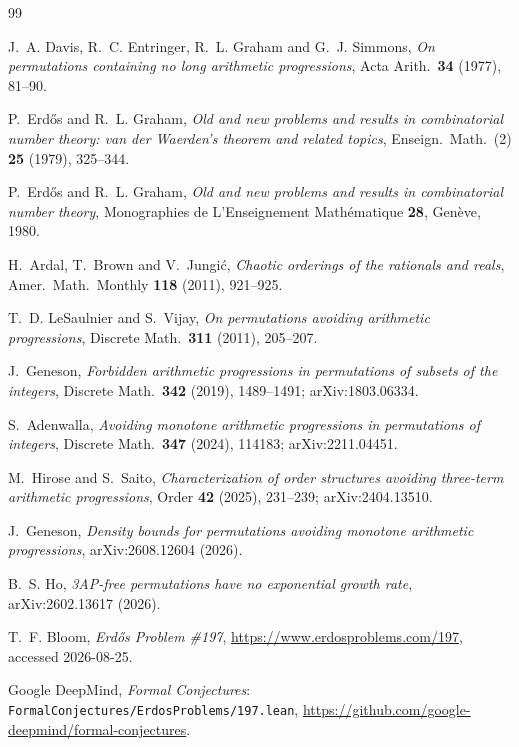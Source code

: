 \documentclass[11pt]{article}
\theoremstyle{definition}
\begin{document}
\begin{thebibliography}{99}

 J.~A. Davis, R.~C. Entringer, R.~L. Graham and
G.~J. Simmons, \emph{On permutations containing no long arithmetic
progressions}, Acta Arith.\ \textbf{34} (1977), 81--90.

 P.~Erd\H{o}s and R.~L. Graham, \emph{Old and new problems
and results in combinatorial number theory: van der Waerden's theorem and
related topics}, Enseign.\ Math.\ (2) \textbf{25} (1979), 325--344.

 P.~Erd\H{o}s and R.~L. Graham, \emph{Old and new problems
and results in combinatorial number theory}, Monographies de
L'Enseignement Math\'ematique \textbf{28}, Gen\`eve, 1980.

 H.~Ardal, T.~Brown and V.~Jungi\'c, \emph{Chaotic orderings
of the rationals and reals}, Amer.\ Math.\ Monthly \textbf{118} (2011),
921--925.

 T.~D. LeSaulnier and S.~Vijay, \emph{On permutations avoiding
arithmetic progressions}, Discrete Math.\ \textbf{311} (2011), 205--207.

 J.~Geneson, \emph{Forbidden arithmetic progressions in
permutations of subsets of the integers}, Discrete Math.\ \textbf{342}
(2019), 1489--1491; arXiv:1803.06334.

 S.~Adenwalla, \emph{Avoiding monotone arithmetic progressions
in permutations of integers}, Discrete Math.\ \textbf{347} (2024), 114183;
arXiv:2211.04451.

 M.~Hirose and S.~Saito, \emph{Characterization of order
structures avoiding three-term arithmetic progressions}, Order \textbf{42}
(2025), 231--239; arXiv:2404.13510.

 J.~Geneson, \emph{Density bounds for permutations avoiding
monotone arithmetic progressions}, arXiv:2608.12604 (2026).

 B.~S. Ho, \emph{3AP-free permutations have no exponential
growth rate}, arXiv:2602.13617 (2026).

 T.~F. Bloom, \emph{Erd\H{o}s Problem \#197},
\url{https://www.erdosproblems.com/197}, accessed 2026-08-25.

 Google DeepMind, \emph{Formal Conjectures}:
\texttt{FormalConjectures/ErdosProblems/197.lean},
\url{https://github.com/google-deepmind/formal-conjectures}.

\end{thebibliography}
\end{document}
